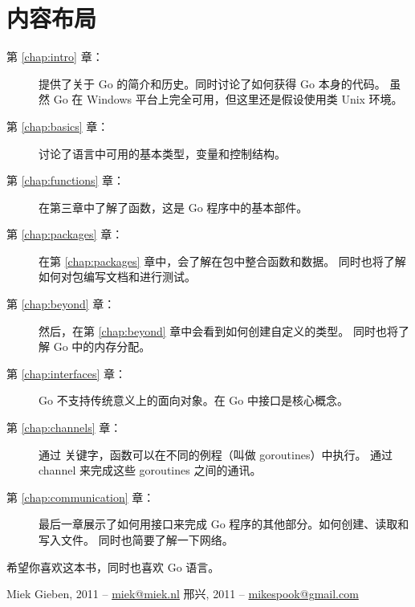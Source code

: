 \section*{内容布局}
\begin{description}
\item[第 \ref{chap:intro} 章：]
提供了关于 Go 的简介和历史。同时讨论了如何获得 Go 本身的代码。
虽然 Go 在 Windows 平台上完全可用，但这里还是假设使用类 Unix 环境。

\item[第 \ref{chap:basics} 章：]
讨论了语言中可用的基本类型，变量和控制结构。

\item[第 \ref{chap:functions} 章：]
在第三章中了解了函数，这是 Go 程序中的基本部件。

\item[第 \ref{chap:packages} 章：]
在第 \ref{chap:packages} 章中，会了解在包中整合函数和数据。
同时也将了解如何对包编写文档和进行测试。

\item[第 \ref{chap:beyond} 章：]
然后，在第 \ref{chap:beyond} 章中会看到如何创建自定义的类型。
同时也将了解 Go 中的内存分配。

\item[第 \ref{chap:interfaces} 章：]
Go 不支持传统意义上的面向对象。在 Go 中接口是核心概念。

\item[第 \ref{chap:channels} 章：]
通过  关键字，函数可以在不同的例程（叫做 goroutines）中执行。
通过 channel 来完成这些 goroutines 之间的通讯。

\item[第 \ref{chap:communication} 章：]
最后一章展示了如何用接口来完成 Go 程序的其他部分。如何创建、读取和写入文件。
同时也简要了解一下网络。
\end{description}

希望你喜欢这本书，同时也喜欢 Go 语言。

\begin{raggedright}
Miek Gieben, 2011 -- \url{miek@miek.nl}
邢兴, 2011 -- \url{mikespook@gmail.com}
\end{raggedright}
